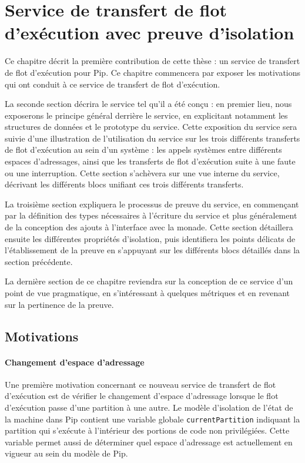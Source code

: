 \chapter{Service de transfert de flot d'exécution avec preuve d'isolation}

Ce chapitre décrit la première contribution de cette thèse : un service de transfert de flot d'exécution pour Pip. Ce chapitre commencera par exposer les motivations qui ont conduit à ce service de transfert de flot d'exécution.

La seconde section décrira le service tel qu'il a été conçu : en premier lieu, nous exposerons le principe général derrière le service, en explicitant notamment les structures de données et le prototype du service. Cette exposition du service sera suivie d'une illustration de l'utilisation du service sur les trois différents transferts de flot d'exécution au sein d'un système : les appels systèmes entre différents espaces d'adressages, ainsi que les transferts de flot d'exécution suite à une faute ou une interruption. Cette section s'achèvera sur une vue interne du service, décrivant les différents blocs unifiant ces trois différents transferts.

La troisième section expliquera le processus de preuve du service, en commençant par la définition des types nécessaires à l'écriture du service et plus généralement de la conception des ajouts à l'interface avec la monade. Cette section détaillera ensuite les différentes propriétés d'isolation, puis identifiera les points délicats de l'établissement de la preuve en s'appuyant sur les différents blocs détaillés dans la section précédente.

La dernière section de ce chapitre reviendra sur la conception de ce service d'un point de vue pragmatique, en s'intéressant à quelques métriques et en revenant sur la pertinence de la preuve.

	\section{Motivations}

		\subsubsection{Changement d'espace d'adressage}

		Une première motivation concernant ce nouveau service de transfert de flot d'exécution est de vérifier le changement d'espace d'adressage lorsque le flot d'exécution passe d'une partition à une autre. Le modèle d'isolation de l'état de la machine dans Pip contient une variable globale \texttt{currentPartition} indiquant la partition qui s'exécute à l'intérieur des portions de code non privilégiées. Cette variable permet aussi de déterminer quel espace d'adressage est actuellement en vigueur au sein du modèle de Pip.

